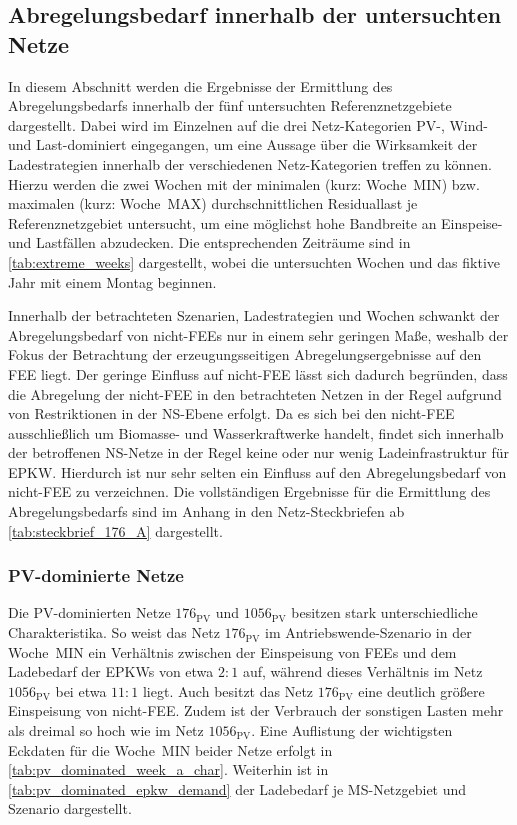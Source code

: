 \subsection{Abregelungsbedarf innerhalb der untersuchten Netze}\label{chap:cur_results}

In diesem Abschnitt werden die Ergebnisse der Ermittlung des Abregelungsbedarfs innerhalb der fünf untersuchten Referenznetzgebiete dargestellt.
Dabei wird im Einzelnen auf die drei Netz-Kategorien \gls{PV}-, Wind- und Last-dominiert eingegangen, um eine Aussage über die Wirksamkeit der Ladestrategien innerhalb der verschiedenen Netz-Kategorien treffen zu können.
Hierzu werden die zwei Wochen mit der minimalen (kurz: Woche~MIN) bzw. maximalen (kurz: Woche~MAX) durchschnittlichen Residuallast je Referenznetzgebiet untersucht, um eine möglichst hohe Bandbreite an Einspeise- und Lastfällen abzudecken.
Die entsprechenden Zeiträume sind in \autoref{tab:extreme_weeks} dargestellt, wobei die untersuchten Wochen und das fiktive Jahr mit einem Montag beginnen.



Innerhalb der betrachteten Szenarien, Ladestrategien und Wochen schwankt der Abregelungsbedarf von nicht-\glspl{FEE} nur in einem sehr geringen Maße, weshalb der Fokus der Betrachtung der erzeugungsseitigen Abregelungsergebnisse auf den \gls{FEE} liegt.
Der geringe Einfluss auf nicht-\gls{FEE} lässt sich dadurch begründen, dass die Abregelung der nicht-\gls{FEE} in den betrachteten Netzen in der Regel aufgrund von Restriktionen in der \gls{NS}-Ebene erfolgt.
Da es sich bei den nicht-\gls{FEE} ausschließlich um Biomasse- und Wasserkraftwerke handelt, findet sich innerhalb der betroffenen \gls{NS}-Netze in der Regel keine oder nur wenig Ladeinfrastruktur für \gls{EPKW}.
Hierdurch ist nur sehr selten ein Einfluss auf den Abregelungsbedarf von nicht-\gls{FEE} zu verzeichnen.
Die vollständigen Ergebnisse für die Ermittlung des Abregelungsbedarfs sind im Anhang in den Netz-Steckbriefen ab \autoref{tab:steckbrief_176_A} dargestellt.


\subsubsection{PV-dominierte Netze}

Die \gls{PV}-dominierten Netze \(176_{\text{PV}}\) und \(1056_{\text{PV}}\) besitzen stark unterschiedliche Charakteristika.
So weist das Netz \(176_{\text{PV}}\) im Antriebswende-Szenario in der Woche~MIN ein Verhältnis zwischen der Einspeisung von \glspl{FEE} und dem Ladebedarf der \glspl{EPKW} von etwa \(2:1\) auf, während dieses Verhältnis im Netz \(1056_{\text{PV}}\) bei etwa \(11:1\) liegt.
Auch besitzt das Netz \(176_{\text{PV}}\) eine deutlich größere Einspeisung von nicht-\gls{FEE}.
Zudem ist der Verbrauch der sonstigen Lasten mehr als dreimal so hoch wie im Netz \(1056_{\text{PV}}\).
Eine Auflistung der wichtigsten Eckdaten für die Woche~MIN beider Netze erfolgt in \autoref{tab:pv_dominated_week_a_char}.
Weiterhin ist in \autoref{tab:pv_dominated_epkw_demand} der Ladebedarf je \gls{MS}-Netzgebiet und Szenario dargestellt.

